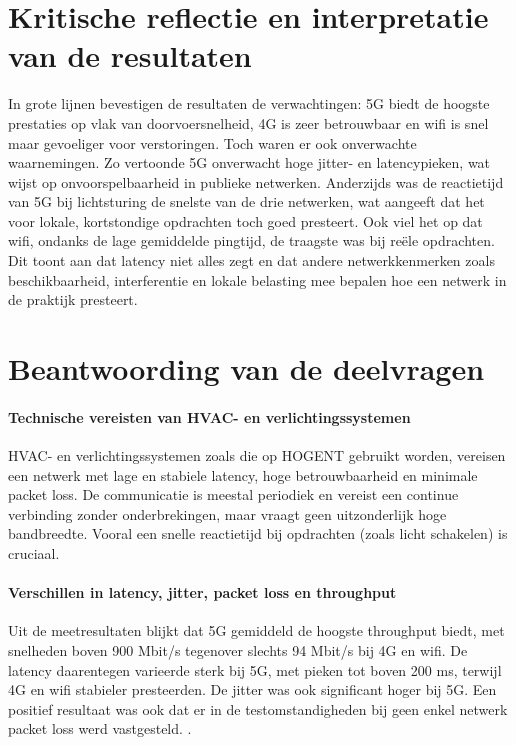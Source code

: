 \section{Kritische reflectie en interpretatie van de resultaten}
In grote lijnen bevestigen de resultaten de verwachtingen: 5G biedt de hoogste prestaties op vlak van doorvoersnelheid, 4G is zeer betrouwbaar en wifi is snel maar gevoeliger voor verstoringen. Toch waren er ook onverwachte waarnemingen. Zo vertoonde 5G onverwacht hoge jitter- en latencypieken, wat wijst op onvoorspelbaarheid in publieke netwerken. Anderzijds was de reactietijd van 5G bij lichtsturing de snelste van de drie netwerken, wat aangeeft dat het voor lokale, kortstondige opdrachten toch goed presteert.
Ook viel het op dat wifi, ondanks de lage gemiddelde pingtijd, de traagste was bij reële opdrachten. Dit toont aan dat latency niet alles zegt en dat andere netwerkkenmerken zoals beschikbaarheid, interferentie en lokale belasting mee bepalen hoe een netwerk in de praktijk presteert.


\section{Beantwoording van de deelvragen}

\paragraph{Technische vereisten van HVAC- en verlichtingssystemen}
HVAC- en verlichtingssystemen zoals die op HOGENT gebruikt worden, vereisen een netwerk met lage en stabiele latency, hoge betrouwbaarheid en minimale packet loss. De communicatie is meestal periodiek en vereist een continue verbinding zonder onderbrekingen, maar vraagt geen uitzonderlijk hoge bandbreedte. Vooral een snelle reactietijd bij opdrachten (zoals licht schakelen) is cruciaal.

\paragraph{Verschillen in latency, jitter, packet loss en throughput}
Uit de meetresultaten blijkt dat 5G gemiddeld de hoogste throughput biedt, met snelheden boven 900 Mbit/s tegenover slechts 94 Mbit/s bij 4G en wifi. De latency daarentegen varieerde sterk bij 5G, met pieken tot boven 200 ms, terwijl 4G en wifi stabieler presteerden. De jitter was ook significant hoger bij 5G. Een positief resultaat was ook dat er in de testomstandigheden bij geen enkel netwerk packet loss werd vastgesteld. .

